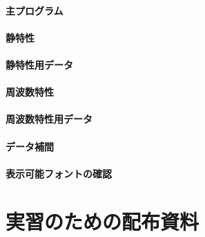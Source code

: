 \documentclass[uplatex,a4paper,11pt,oneside,openany]{jsbook}
\begin{document}
\subsection{主プログラム}



\newpage

\subsection{静特性}



\subsection{静特性用データ}



\newpage

\subsection{周波数特性}



\subsection{周波数特性用データ}



\subsection{データ補間}



\newpage

\subsection{表示可能フォントの確認}



\part{実習のための配布資料}
\end{document}
